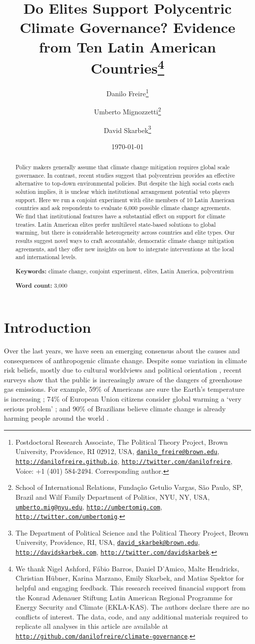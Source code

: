 \documentclass[a4paper,12pt]{article}
\title{Do Elites Support Polycentric Climate Governance? Evidence from Ten Latin American Countries\thanks{We thank Nigel Ashford, F\'{a}bio Barros, Daniel D'Amico, Malte Hendricks, Christian H\"{u}bner, Karina Marzano, Emily Skarbek, and Matias Spektor for helpful and engaging feedback. This research received financial support from the Konrad Adenauer Stiftung Latin American Regional Programme for Energy Security and Climate (EKLA-KAS). The authors declare there are no conflicts of interest. The data, code, and any additional materials required to replicate all analyses in this article are available at \href{http://github.com/danilofreire/climate-governance}{\texttt{http://github.com/danilofreire/climate-governance}}.}}
\author{Danilo Freire\thanks{Postdoctoral Research Associate, The Political Theory Project, Brown University, Providence, RI 02912, USA, \href{mailto:danilo_freire@brown.edu}{\texttt{danilo\_freire@brown.edu}}, \href{http://danilofreire.github.io}{\texttt{http://danilofreire.github.io}}, \href{http://twitter.com/danilofreire}{\texttt{http://twitter.com/danilofreire}}, Voice: +1 (401) 584-2494. Corresponding author.} 
\and Umberto Mignozzetti\thanks{School of International Relations, Funda\c{c}\~{a}o Getulio Vargas, S\~{a}o Paulo, SP, Brazil and Wilf Family Department of Politics, NYU, NY, USA, \href{mailto:umberto.mig@nyu.edu}{\texttt{umberto.mig@nyu.edu}}, \href{http://umbertomig.com}{\texttt{http://umbertomig.com}}, \href{http://twitter.com/umbertomig}{\texttt{http://twitter.com/umbertomig}}.} \and David Skarbek\thanks{The Department of Political Science and the Political Theory Project, Brown University, Providence, RI, USA, \href{mailto:david_skarbek@brown.edu}{\texttt{david\_skarbek@brown.edu}}, \href{http://davidskarbek.com}{\texttt{http://davidskarbek.com}}, \href{http://twitter.com/davidskarbek}{\texttt{http://twitter.com/davidskarbek}}.}
}
\date{\today}
\begin{document}
\maketitle

\begin{abstract}
\onehalfspacing
\noindent
Policy makers generally assume that climate change mitigation requires global scale governance. In contrast, recent studies suggest that polycentrism provides an effective alternative to top-down environmental policies. But despite the high social costs each solution implies, it is unclear which institutional arrangement potential veto players support. Here we run a conjoint experiment with elite members of 10 Latin American countries and ask respondents to evaluate 6,000 possible climate change agreements. We find that institutional features have a substantial effect on support for climate treaties. Latin American elites prefer multilevel state-based solutions to global warming, but there is considerable heterogeneity across countries and elite types. Our results suggest novel ways to craft accountable, democratic climate change mitigation agreements, and they offer new insights on how to integrate interventions at the local and international levels.

\vspace{.5cm}

\noindent 
\textbf{Keywords:} climate change, conjoint experiment, elites, Latin America, polycentrism

\vspace{.5cm}

\noindent 
\textbf{Word count:} 3,000
\end{abstract}

\newpage

\doublespacing

\section{Introduction}%
\label{sec:introduction}

Over the last years, we have seen an emerging consensus about the causes and consequences of anthropogenic climate change. Despite some variation in climate risk beliefs, mostly due to cultural worldviews and political orientation \citep{hornsey2016meta}, recent surveys show that the public is increasingly aware of the dangers of greenhouse gas emissions. For example, 59\% of Americans are sure the Earth's temperature is increasing \citep{stanfordearth2018}; 74\% of European Union citizens consider global warming a `very serious problem' \citep{europe2018survey}; and 90\% of Brazilians believe climate change is already harming people around the world \citep{pew2018climate}.
\end{document}
